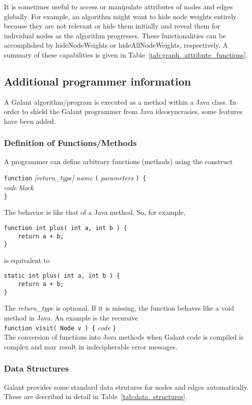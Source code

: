 

It is sometimes useful to access or manipulate attributes of nodes and edges
globally.
For example, an algorithm might want to hide node weights entirely
because they are not relevant
or hide them initially and reveal them for individual nodes as
the algorithm progresses.
These functionalities can be accomplished by
\textsf{hideNodeWeights} or \textsf{hideAllNodeWeights}, respectively.
A summary of these capabilities is given in Table~\ref{tab:graph_attribute_functions}.

\subsection{Additional programmer information}

A Galant algorithm/program is executed as a method within a Java class.
In order to shield the Galant programmer from Java ideosyncrasies,
some features have been added.

\subsubsection{Definition of Functions/Methods}\label{sec:functions}

A programmer can define arbitrary functions (methods) using the construct

\texttt{function} \textsl{[return\_type]} \textsl{name} \texttt{(}
 \textsl{parameters} \texttt{) \{} \\
 \hspace*{3em} \emph{code block} \\
 \texttt{\}}

The behavior is like that of a Java method. So, for example,
\begin{verbatim}
function int plus( int a, int b ) {
    return a + b;
}
\end{verbatim}
is equivalent to
\begin{verbatim}
static int plus( int a, int b ) {
    return a + b;
}
\end{verbatim}

The \textsl{return\_type} is optional. If it is missing, the function behaves like
a \textsf{void} method in Java. An example is the recursive
\\
\texttt{function visit( Node v ) \{} \textsl{code} \texttt{\}}
\\
The conversion of functions into Java methods when Galant code is compiled
is complex and may result in indecipherable error messages.



\subsubsection{Data Structures}

Galant provides some standard data strutures for nodes and edges automatically.
These are described in detail in Table~\ref{tab:data_structures}.

